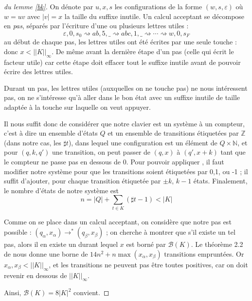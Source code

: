 \documentclass[12pt, a4paper]{article}
\newcommand{\Kinf}{||K||_{\infty}}
\begin{document}
    \begin{proof}[du lemme \ref{bk}]
        On dénote par $u,x,s$ les configurations de la forme $(w,s,\varepsilon)$ où $w = uv$ avec $|v| = x$ la taille du suffixe inutile.
        Un calcul acceptant se décompose en \emph{pas}, séparés par l'écriture d'une ou plusieurs lettres utiles :
        \[ \varepsilon,0,s_0 \rightsquigarrow ab,5,\_ \rightsquigarrow abc,1,\_ \rightsquigarrow \cdots \rightsquigarrow w,0,s_F \]
        au début de chaque pas, les lettres utiles ont été écrites par une seule touche : donc $x < \Kinf$. De même avant la dernière étape d'un pas (celle qui écrit le facteur utile) car cette étape doit effacer tout le suffixe inutile avant de pouvoir écrire des lettres utiles.

        Durant un pas, les lettres utiles (auxquelles on ne touche pas) ne nous intéressent pas, on ne s'intéresse qu'à aller dans le bon état avec un suffixe inutile de taille adaptée à la touche sur laquelle on veut appuyer.
        
        Il nous suffit donc de considérer que notre clavier est un système à un compteur, c'est à dire un ensemble d'états $Q$ et un ensemble de transitions étiquetées par $\mathbb{Z}$ (dans notre cas, les $\sharp t$), dans lequel une configuration est un élément de $Q \times \mathbb{N}$, et pour $(q,k,q')$ une transition, on peut passer de $(q,x)$ à $(q',x+k)$ tant que le compteur ne passe pas en dessous de 0.
        Pour pouvoir appliquer \cite{shortpathOCS}, il faut modifier notre système pour que les transitions soient étiquetées par 0,1, ou -1 ; il suffit d'ajouter, pour chaque transition étiquetée par $\pm k$, $k-1$ états.
        Finalement, le nombre d'états de notre système est 
        \[n = |Q| + \sum_{t \in K} (\sharp t - 1) < |K|\] 

        Comme on se place dans un calcul acceptant, on considère que notre pas est possible : $(q_\alpha,x_\alpha) \rightarrow^* (q_\beta,x_\beta)$ ; on cherche à montrer que s'il existe un tel pas, alors il en existe un durant lequel $x$ est borné par $\mathcal{B}(K)$.
        Le théorème 2.2 de \cite{shortpathOCS} nous donne une borne de $14n^2 + n \max (x_\alpha,x_\beta)$ transitions empruntées. Or $x_\alpha,x_\beta < \Kinf$, et les transitions ne peuvent pas être toutes positives, car on doit revenir en dessous de $\Kinf$.
        
        Ainsi, $\mathcal{B}(K) = 8|K|^2$ convient.
    \end{proof}

    \clearpage
    \printbibliography
\end{document}
